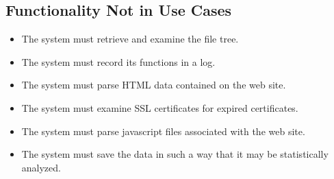 \subsection{Functionality Not in Use Cases}
\begin{itemize}
    \item The system must retrieve and examine the file tree.
    \item The system must record its functions in a log.
    \item The system must parse HTML data contained on the web site.
    \item The system must examine SSL certificates for expired certificates.
    \item The system must parse javascript files associated with the web site.
    \item The system must save the data in such a way that it may be statistically analyzed.
\end{itemize}
